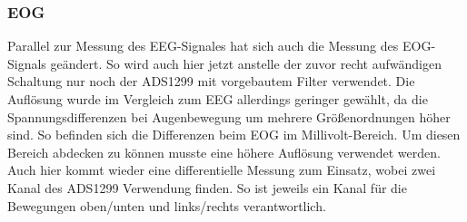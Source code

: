 \subsubsection{EOG} \label{eog-subsubsec}

Parallel zur Messung des EEG-Signales hat sich auch die Messung des EOG-Signals geändert. So wird auch hier jetzt anstelle der zuvor recht aufwändigen Schaltung nur noch der ADS1299 mit vorgebautem Filter verwendet. Die Auflösung wurde im Vergleich zum EEG allerdings geringer gewählt, da die Spannungsdifferenzen bei Augenbewegung um mehrere Größenordnungen höher sind. So befinden sich die Differenzen beim EOG im Millivolt-Bereich. Um diesen Bereich abdecken zu können musste eine höhere Auflösung verwendet werden. Auch hier kommt wieder eine differentielle Messung zum Einsatz, wobei zwei Kanal des ADS1299 Verwendung finden. So ist jeweils ein Kanal für die Bewegungen oben/unten und links/rechts verantwortlich.    




